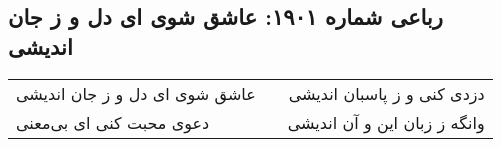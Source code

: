 \begin{center}
\section*{رباعی شماره ۱۹۰۱: عاشق شوی ای دل و ز جان اندیشی}
\label{sec:1901}
\begin{longtable}{l p{0.5cm} r}
عاشق شوی ای دل و ز جان اندیشی
&&
دزدی کنی و ز پاسبان اندیشی
\\
دعوی محبت کنی ای بی‌معنی
&&
وانگه ز زبان این و آن اندیشی
\\
\end{longtable}
\end{center}
